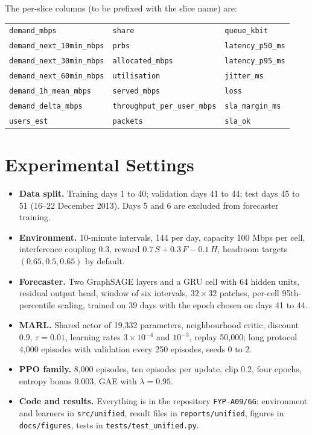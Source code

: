 The per-slice columns (to be prefixed with the slice name) are:

\begin{center}
\footnotesize
\begin{tabular}{lll}
\texttt{demand\_mbps} & \texttt{share} & \texttt{queue\_kbit} \\
\texttt{demand\_next\_10min\_mbps} & \texttt{prbs} & \texttt{latency\_p50\_ms} \\
\texttt{demand\_next\_30min\_mbps} & \texttt{allocated\_mbps} & \texttt{latency\_p95\_ms} \\
\texttt{demand\_next\_60min\_mbps} & \texttt{utilisation} & \texttt{jitter\_ms} \\
\texttt{demand\_1h\_mean\_mbps} & \texttt{served\_mbps} & \texttt{loss} \\
\texttt{demand\_delta\_mbps} & \texttt{throughput\_per\_user\_mbps} & \texttt{sla\_margin\_ms} \\
\texttt{users\_est} & \texttt{packets} & \texttt{sla\_ok} \\
\end{tabular}
\end{center}

\section{Experimental Settings}
\label{app:status}
\begin{itemize}
	\item \textbf{Data split.} Training days 1 to 40; validation days 41 to 44; test days 45 to 51 (16--22 December 2013). Days 5 and 6 are excluded from forecaster training.
	\item \textbf{Environment.} 10-minute intervals, 144 per day, capacity 100 Mbps per cell, interference coupling 0.3, reward $0.7\,S+0.3\,F-0.1\,H$, headroom targets $(0.65,0.5,0.65)$ by default.
	\item \textbf{Forecaster.} Two GraphSAGE layers and a GRU cell with 64 hidden units, residual output head, window of six intervals, $32\times32$ patches, per-cell 95th-percentile scaling, trained on 39 days with the epoch chosen on days 41 to 44.
	\item \textbf{MARL.} Shared actor of 19{,}332 parameters, neighbourhood critic, discount 0.9, $\tau=0.01$, learning rates $3\times10^{-4}$ and $10^{-3}$, replay 50{,}000; long protocol 4{,}000 episodes with validation every 250 episodes, seeds 0 to 2.
	\item \textbf{PPO family.} 8{,}000 episodes, ten episodes per update, clip 0.2, four epochs, entropy bonus 0.003, GAE with $\lambda=0.95$.
	\item \textbf{Code and results.} Everything is in the repository \texttt{FYP-A09/6G}: environment and learners in \texttt{src/unified}, result files in \texttt{reports/unified}, figures in \texttt{docs/figures}, tests in \texttt{tests/test\_unified.py}.
\end{itemize}
